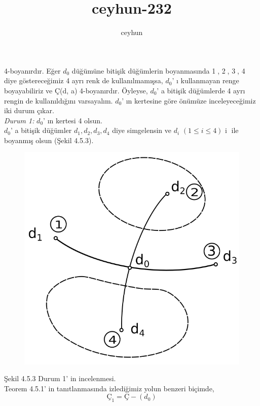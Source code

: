 \documentclass[11pt]{amsbook}
\title{ceyhun-232}
\author{ceyhun}
\begin{document}
4-boyanırdır. Eğer $ d_0 $ düğümüne bitişik düğümlerin boyanmasında
\textcircled{1}, \textcircled{2}, \textcircled{3}, \textcircled{4}
diye göstereceğimiz 4 ayrı renk de kullanılmamışsa, $ d_0 $' ı
kullanmayan renge boyayabiliriz ve Ç(d, a)
4-boyanırdır. Öyleyse, $ d_0 $' a bitişik düğümlerde
4 ayrı rengin de kullanıldığını varsayalım. $ d_0 $' ın
kertesine göre önümüze inceleyeceğimiz iki durum
çıkar.\\[0.1in]
\textit{Durum 1:} $ d_0 $' ın kertesi 4 olsun.\\[0.1in]
$ d_0 $' a bitişik düğümler $ d_1, d_2, d_3, d_4 $ diye
simgelensin ve $ d_i $ $ (1 \leq i \leq 4) $ \textcircled{i}
ile boyanmış olsun (Şekil 4.5.3).
\begin{figure}[h]
    \centering
	\includegraphics[scale=0.3]{drawing}
\end{figure}

Şekil 4.5.3 Durum 1' in incelenmesi.\\[0.1in]
Teorem 4.5.1' in tanıtlanmasında izlediğimiz yolun
benzeri biçimde,
\begin{equation*}
	Ç_1 = Ç - (d_0)
\end{equation*}
\end{document}

